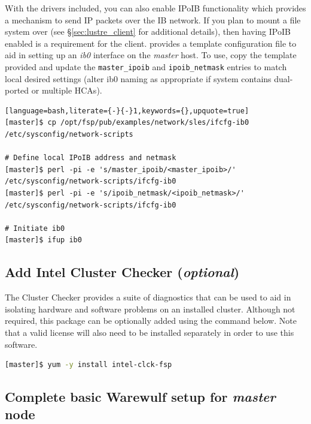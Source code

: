 \documentclass[letterpaper]{article}
\begin{document}
With the \InfiniBand{} drivers included, you can also enable IPoIB functionality
which provides a mechanism to send IP packets over the IB network. If you plan
to mount a \Lustre{} file system over \InfiniBand{} (see \S\ref{sec:lustre_client}
for additional details), then having IPoIB enabled is a requirement for the
\Lustre{} client. \FSP{} provides a template configuration file to aid in setting up
an {\em ib0} interface on the {\em master} host. To use, copy the template
provided and update the \texttt{master\_ipoib} and
\texttt{ipoib\_netmask} entries to match local desired settings (alter ib0
naming as appropriate if system contains dual-ported or multiple HCAs). 

\begin{lstlisting}[language=bash,literate={-}{-}1,keywords={},upquote=true]
[master]$ cp /opt/fsp/pub/examples/network/sles/ifcfg-ib0 /etc/sysconfig/network-scripts

# Define local IPoIB address and netmask
[master]$ perl -pi -e 's/master_ipoib/<master_ipoib>/' /etc/sysconfig/network-scripts/ifcfg-ib0
[master]$ perl -pi -e 's/ipoib_netmask/<ipoib_netmask>/' /etc/sysconfig/network-scripts/ifcfg-ib0

# Initiate ib0
[master]$ ifup ib0
\end{lstlisting}

\subsection{Add Intel Cluster Checker ({\em optional})} \label{sec:add_clck}

The \Intel{} Cluster Checker provides a suite of diagnostics that can be used to
aid in isolating hardware and software problems on an installed
cluster. Although not required, this package can be optionally added using the
command below. Note that a valid license will also need to be installed
separately in order to use this software.

\begin{lstlisting}[language=bash,keywords={}]
[master]$ yum -y install intel-clck-fsp
\end{lstlisting}


\subsection{Complete basic Warewulf setup for {\em master} node}
\end{document}
